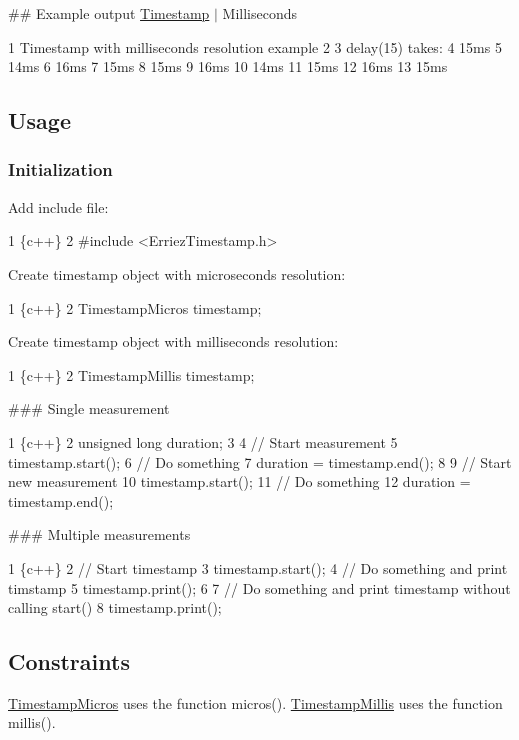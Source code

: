 \#\# Example output \hyperlink{class_timestamp}{Timestamp} $\vert$ Milliseconds 
\begin{DoxyCode}
1 Timestamp with milliseconds resolution example
2 
3 delay(15) takes:
4 15ms
5 14ms
6 16ms
7 15ms
8 15ms
9 16ms
10 14ms
11 15ms
12 16ms
13 15ms
\end{DoxyCode}


\subsection*{Usage}

\subsubsection*{Initialization}

Add include file\+: 
\begin{DoxyCode}
1 \{c++\}
2 #include <ErriezTimestamp.h>
\end{DoxyCode}


Create timestamp object with microseconds resolution\+: 
\begin{DoxyCode}
1 \{c++\}
2 TimestampMicros timestamp;
\end{DoxyCode}


Create timestamp object with milliseconds resolution\+: 
\begin{DoxyCode}
1 \{c++\}
2 TimestampMillis timestamp;
\end{DoxyCode}


\#\#\# Single measurement 
\begin{DoxyCode}
1 \{c++\}
2 unsigned long duration;
3 
4 // Start measurement
5 timestamp.start();
6 // Do something
7 duration = timestamp.end();
8 
9 // Start new measurement
10 timestamp.start();
11 // Do something
12 duration = timestamp.end();
\end{DoxyCode}


\#\#\# Multiple measurements 
\begin{DoxyCode}
1 \{c++\}
2 // Start timestamp
3 timestamp.start();
4 // Do something and print timstamp
5 timestamp.print();
6 
7 // Do something and print timestamp without calling start()
8 timestamp.print();
\end{DoxyCode}


\subsection*{Constraints}

\hyperlink{class_timestamp_micros}{Timestamp\+Micros} uses the function micros(). \hyperlink{class_timestamp_millis}{Timestamp\+Millis} uses the function millis().

